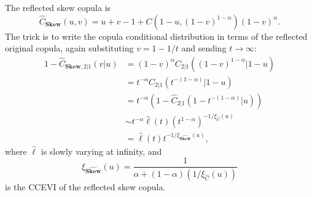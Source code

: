 \documentclass{article}\usepackage[]{graphicx}\usepackage[]{color}
\def\Chat{{\widehat C}}
\def\Sk{\mathrm{\textbf{Skew}}}
\def\a{\alpha}
\begin{document}
The reflected skew copula is
\begin{equation}
\Chat_{\Sk}(u,v) =
    u + v - 1 + C(1-u, (1-v)^{1-\a}) (1-v)^{\a}.
\end{equation}
The trick is to write the copula conditional distribution in terms of the reflected original copula, again substituting $v=1-1/t$ and sending $t\rightarrow\infty$:
\begin{align}
1 - \Chat_{\Sk,2|1}(v|u)
    &=    (1-v)^{\a} C_{2|1}((1-v)^{1-\a}|1-u)  \\
    &=    t^{-\a} C_{2|1}(t^{-(1-\a)}|1-u) \\
    &=    t^{-\a} \left(1 - \Chat_{2|1} (1 - t^{-(1-\a)} | u) \right) \\
    &\sim t^{-\a} \hat{\ell}(t) \left(t^{1-\a}\right) ^ {-1/\xi_{\Chat}(u)} \\
    &=    \hat{\ell}(t) t^{-1/\xi_{\widehat{\Sk}}(u)},
\end{align}
where $\hat{\ell}$ is slowly varying at infinity, and 
\begin{equation}
\xi_{\widehat{\Sk}}(u)
    = \frac{1}{\a + (1-\a)(1/\xi_{\Chat}(u))}
\end{equation}
is the CCEVI of the reflected skew copula.
\end{document}
